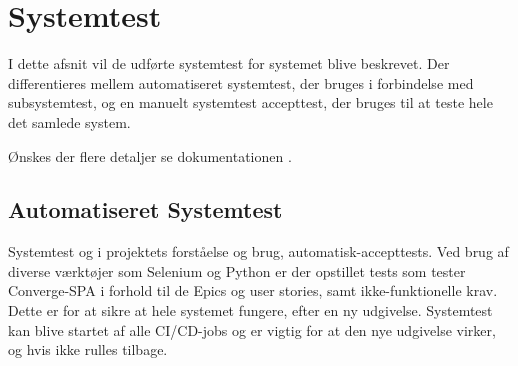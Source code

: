 \section{Systemtest}

I dette afsnit vil de udførte systemtest for systemet blive beskrevet. Der differentieres mellem automatiseret systemtest, der bruges i forbindelse med subsystemtest, og en manuelt systemtest accepttest, der bruges til at teste hele det samlede system.

Ønskes der flere detaljer se dokumentationen \cite{systemtests}. 

\subsection{Automatiseret Systemtest}

Systemtest og i projektets forståelse og brug, automatisk-accepttests. Ved brug af diverse værktøjer som Selenium \cite[Selenium]{converge-terms} og Python er der opstillet tests som tester Converge-SPA i forhold til de Epics og user stories, samt ikke-funktionelle krav. Dette er for at sikre at hele systemet fungere, efter en ny udgivelse. Systemtest kan blive startet af alle CI/CD-jobs \cite[CI/CD-jobs]{converge-terms} og er vigtig for at den nye udgivelse virker, og hvis ikke rulles tilbage.

